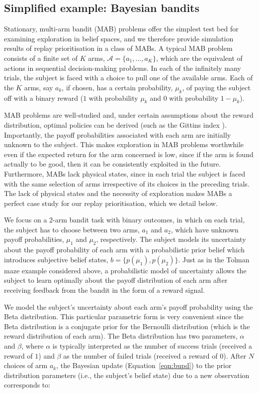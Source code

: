 \subsection*{Simplified example: Bayesian bandits}

Stationary, multi-arm bandit (MAB) problems offer the  simplest test bed for examining exploration in belief spaces, and we therefore provide simulation results of replay prioritisation in a class of MABs. A typical MAB problem consists of a finite set of $K$ arms, $\mathcal{A} = \{ a_1, ..., a_K \}$, which are the equivalent of actions in sequential decision-making problems. In each of the infinitely many trials, the subject is faced with a choice to pull one of the available arms. Each of the $K$ arms, say $a_k$, if chosen, has a certain probability, $\mu_k$, of paying  the subject off with a binary reward ($1$ with probability $\mu_k$ and $0$ with probability $1-\mu_k$). 

MAB problems are well-studied and, under certain assumptions about the reward distribution, optimal policies can be derived (such as the Gittins index \parencite{gittinsBanditProcessesDynamic1979}). Importantly, the payoff probabilities associated with each arm are initially unknown to the subject. This makes exploration in MAB problems worthwhile even if the expected return for the arm concerned is low, since if the arm is found actually to be good, then it can be consistently exploited in the future. Furthermore, MABs lack physical states, since in each trial the subject is faced with the same selection of arms irrespective of its choices in the preceding trials. The lack of physical states and the necessity of exploration makes MABs a perfect case study for our replay prioritisation, which we detail below. 

    We focus on a 2-arm bandit task with binary outcomes, in which on each trial, the subject has to choose between two arms, $a_1$ and $a_2$, which have unknown payoff probabilities, $\mu_1$ and $\mu_2$,  respectively. The subject models its uncertainty about the payoff probability of each arm with a probabilistic prior belief which introduces subjective belief states, $b=\{ p(\mu_1), p(\mu_2) \}$. Just as in the Tolman maze example considered above, a probabilistic model of uncertainty allows the subject to  learn optimally about the payoff distribution of each arm after receiving feedback from the bandit in the form of a reward signal. 

We model the subject's uncertainty about each arm's payoff probability using the Beta distribution. This particular parametric form is very convenient since the Beta distribution is a conjugate prior for the Bernoulli distribution (which is the reward distribution of each arm). The Beta distribution has two parameters, $\alpha$ and $\beta$, where $\alpha$ is typically interpreted as the number of success trials (received a reward of $1$) and $\beta$ as the number of failed trials (received a reward of $0$). After $N$ choices of arm $a_k$, the Bayesian update (Equation~\ref{eqn:bupd}) to the prior distribution parameters (i.e., the subject's belief state) due to a new observation corresponds to:

